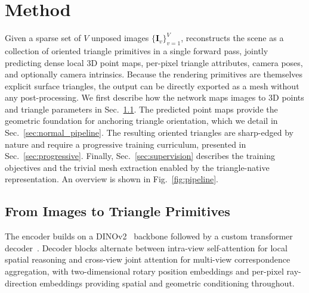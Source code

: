 \section{Method}
\label{sec:method}

Given a sparse set of $V$ unposed images $\{\mathbf{I}_v\}_{v=1}^{V}$, \method reconstructs the scene as a collection of oriented triangle primitives in a single forward pass, jointly predicting dense local 3D point maps, per-pixel triangle attributes, camera poses, and optionally camera intrinsics. Because the rendering primitives are themselves explicit surface triangles, the output can be directly exported as a mesh without any post-processing. We first describe how the network maps images to 3D points and triangle parameters in Sec.~\ref{sec:prediction}. The predicted point maps provide the geometric foundation for anchoring triangle orientation, which we detail in Sec.~\ref{sec:normal_pipeline}. The resulting oriented triangles are sharp-edged by nature and require a progressive training curriculum, presented in Sec.~\ref{sec:progressive}. Finally, Sec.~\ref{sec:supervision} describes the training objectives and the trivial mesh extraction enabled by the triangle-native representation. An overview is shown in Fig.~\ref{fig:pipeline}.

\subsection{From Images to Triangle Primitives}
\label{sec:prediction}

The encoder builds on a DINOv2~\citep{oquab2023dinov2} backbone followed by a custom transformer decoder~\citep{ye2025yonosplat}. Decoder blocks alternate between intra-view self-attention for local spatial reasoning and cross-view joint attention for multi-view correspondence aggregation, with two-dimensional rotary position embeddings and per-pixel ray-direction embeddings providing spatial and geometric conditioning throughout.

